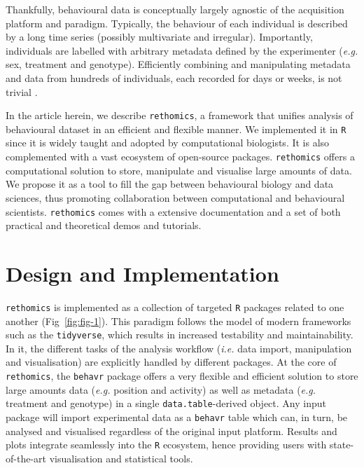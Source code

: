 \documentclass[10pt,letterpaper]{article}\usepackage[]{graphicx}\usepackage[]{color}
\newcommand{\TODO}[2][]{\todo[color=red, fancyline, #1]{\textbf{TODO:} #2}}
\begin{document}
Thankfully, behavioural data is conceptually largely agnostic of the acquisition platform and paradigm. 	
Typically, the behaviour of each individual is described by a long time series (possibly multivariate and irregular).
Importantly, individuals are labelled with arbitrary metadata defined by the experimenter (\emph{e.g.} sex, treatment and genotype).
Efficiently combining and manipulating metadata and data from hundreds of individuals, each recorded for days or weeks, 
is not trivial \TODO{explain why it is not trivial}.

In the article herein, we describe \texttt{rethomics}, a framework that unifies analysis of behavioural dataset in an efficient and flexible manner.
We implemented it in \texttt{R}\cite{r_core_team_r:_2017} since it is widely taught and adopted by computational biologists.
It is also complemented with a vast ecosystem of open-source packages.
\texttt{rethomics} offers a computational solution to store, manipulate and visualise large amounts of data.
We propose it as a tool to fill the gap between behavioural biology and data sciences, thus promoting collaboration between computational and behavioural scientists.
\texttt{rethomics} comes with a extensive documentation and a set of both practical and theoretical demos and tutorials.


\section*{Design and Implementation}

\texttt{rethomics} is implemented as a collection of targeted \texttt{R} packages related to one another (Fig~\ref{fig:fig-1}).
This paradigm follows the model of modern frameworks such as the \texttt{tidyverse}\cite{wickham_tidyverse:_2017}, which results in increased testability and maintainability.
In it, the different tasks of the analysis workflow (\emph{i.e.} data import, manipulation and visualisation)
are explicitly handled by different packages.
At the core of \texttt{rethomics}, the \texttt{behavr} package offers a very flexible and efficient solution to store large amounts data (\emph{e.g.} position and activity) as well as metadata (\emph{e.g.} treatment and genotype) in a single \texttt{data.table}-derived object\cite{dowle_data.table:_2017}.
Any input package will import experimental data as a \texttt{behavr} table which can, in turn, be analysed and visualised regardless of the original input platform.
Results and plots integrate seamlessly into the \texttt{R} ecosystem, hence providing users with state-of-the-art visualisation and statistical tools.
\end{document}
